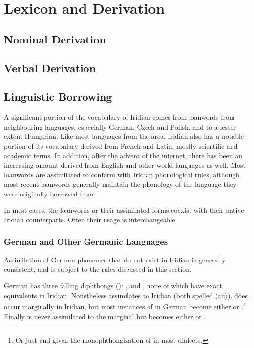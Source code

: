 \chapter{Lexicon and Derivation}

\section{Nominal Derivation}
\section{Verbal Derivation}
\section{Linguistic Borrowing}
A significant portion of the vocabulary of Iridian comes from loanwords from neighbouring languages, especially German, Czech and Polish, and to a lesser extent Hungarian. Like most languages from the area, Iridian also has a notable portion of its vocabulary derived from French and Latin, mostly scientific and academic terms. In addition, after the advent of the internet, there has been an increasing amount derived from English and other world languages as well. Most loanwords are assimilated to conform with Iridian phonological rules, although most recent loanwords generally maintain the phonology of the language they were originally borrowed from.

In most cases, the loanwords or their assimilated forms coexist with their native Iridian counterparts. Often their usage is interchangeable

\subsection{German and Other Germanic Languages}

Assimilation of German phonemes that do not exist in Iridian is generally consistent, and is subject to the rules discussed in this section.

German has three falling diphthongs (\cite{wiese1996}): ,  and , none of which have exact equivalents in Iridian. Nonetheless  assimilates to Iridian  (both spelled $\langle$au$\rangle$).  does occur marginally in Iridian, but most instances of  in German become either  or .\footnote{Or just  and  given the monophthongization of  in most dialects.} Finally  is never assimilated to the marginal  but becomes either  or .

